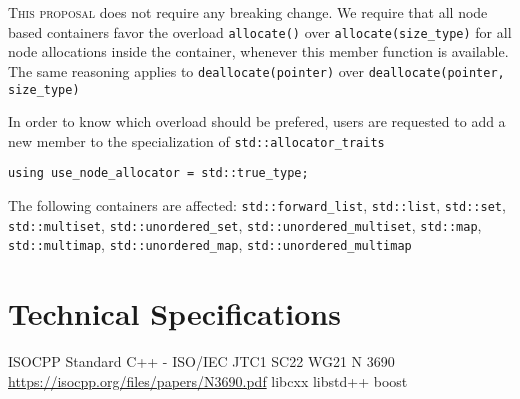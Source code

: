 \documentclass[11pt]{article}
\begin{document}
\textsc{This proposal} does not require any breaking change. We require
that all node based containers favor the overload \texttt{allocate()}
over \texttt{allocate(size\_type)} for all node allocations inside the
container, whenever this member function is available. The same
reasoning applies to \texttt{deallocate(pointer)} over
\texttt{deallocate(pointer, size\_type)}

In order to know which overload should be prefered, users are
requested to add a new member to the specialization of
\texttt{std::allocator\_traits}

\begin{lstlisting}
using use_node_allocator = std::true_type;
\end{lstlisting}

The following containers are affected: \texttt{std::forward\_list},
\texttt{std::list}, \texttt{std::set}, \texttt{std::multiset},
\texttt{std::unordered\_set}, \texttt{std::unordered\_multiset},
\texttt{std::map}, \texttt{std::multimap},
\texttt{std::unordered\_map}, \texttt{std::unordered\_multimap}

\section{Technical Specifications}

\begin{thebibliography}{9}

   ISOCPP Standard C++ - ISO/IEC JTC1 SC22 WG21 N 3690\newline
    \url{https://isocpp.org/files/papers/N3690.pdf}
   libcxx
   libstd++
   boost

\end{thebibliography}
\end{document}
